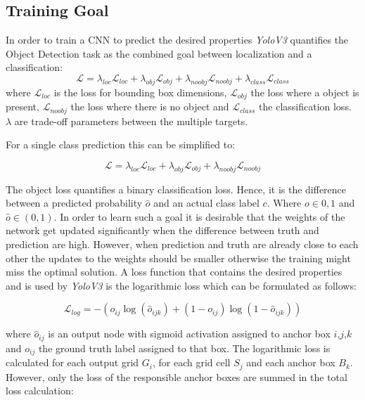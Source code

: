 	\subsection{Training Goal}
	
	In order to train a \ac{CNN} to predict the desired properties \textit{YoloV3} quantifies the Object Detection task as the combined goal between localization and a classification:
	\begin{equation}
	\mathcal{L} = \lambda_{loc}\mathcal{L}_{loc} + \lambda_{obj}\mathcal{L}_{obj} + \lambda_{noobj}\mathcal{L}_{noobj} + \lambda_{class}\mathcal{L}_{class}
	\end{equation}
	where $\mathcal{L}_{loc}$ is the loss for bounding box dimensions, $\mathcal{L}_{obj}$ the loss where a object is present, $\mathcal{L}_{noobj}$ the loss where there is no object and $\mathcal{L}_{class}$ the classification loss. $\lambda$ are trade-off parameters between the multiple targets.
	
	For a single class prediction this can be simplified to:
	
	\begin{equation}
	\mathcal{L} = \lambda_{loc}\mathcal{L}_{loc} + \lambda_{obj}\mathcal{L}_{obj} + \lambda_{noobj}\mathcal{L}_{noobj}
	\end{equation}
	
	The object loss quantifies a binary classification loss. Hence, it is the difference between a predicted probability $\hat o$ and an actual class label $c$. Where $o \in {0,1}$ and $\hat o \in (0,1)$. In order to learn such a goal it is desirable that the weights of the network get updated significantly when the difference between truth and prediction are high. However, when prediction and truth are already close to each other the updates to the weights should be smaller otherwise the training might miss the optimal solution. A loss function that contains the desired properties and is used by \textit{YoloV3} is the logarithmic loss which can be formulated as follows:
	
	\begin{equation}
		\mathcal{L}_{log} = -(o_{ij}\log(\hat o_{ijk}) + (1 - o_{ij})\log(1 - \hat o_{ijk}))
	\end{equation}
	
	where $\hat o_{ij}$ is an output node with sigmoid activation assigned to anchor box $i$,$j$,$k$ and $ o_{ij}$ the ground truth label assigned to that box. The logarithmic loss is calculated for each output grid $G_i$, for each grid cell $S_j$ and each anchor box $B_k$. However, only the loss of the responsible anchor boxes are summed in the total loss calculation:
	

